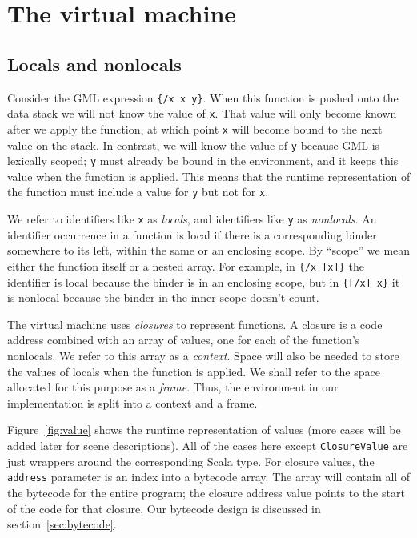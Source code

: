 \section{The virtual machine\label{sec:vm}}

\subsection{Locals and nonlocals\label{sec:localsvsnonlocals}}

Consider the GML expression \verb!{/x x y}!.
When this function is pushed onto the data stack
we will not know the value of \verb!x!.
That value will only become known after we apply the function,
at which point \verb!x! will become bound to the next value on the stack.
In contrast, we will know the value of \verb!y!
because GML is lexically scoped;
\verb!y! must already be bound in the environment,
and it keeps this value when the function is applied.
This means that the runtime representation of the function
must include a value for \verb!y! but not for \verb!x!.

We refer to identifiers like \verb!x! as \emph{locals},
and identifiers like \verb!y! as \emph{nonlocals}.
An identifier occurrence in a function is local if
there is a corresponding binder somewhere to its left,
within the same or an enclosing scope.
By ``scope'' we mean either the function itself or a nested array.
For example, in \verb!{/x [x]}! the identifier is local because
the binder is in an enclosing scope,
but in \verb!{[/x] x}! it is nonlocal
because the binder in the inner scope doesn't count.

The virtual machine uses \emph{closures} to represent functions.
A closure is a code address combined with an array of values,
one for each of the function's nonlocals.
We refer to this array as a \emph{context}.
Space will also be needed to store the values of locals
when the function is applied.
We shall refer to the space allocated for this purpose as a \emph{frame}.
Thus, the environment in our implementation
is split into a context and a frame.

Figure~\ref{fig:value} shows the runtime representation of values
(more cases will be added later for scene descriptions).
All of the cases here except \verb!ClosureValue!
are just wrappers around the corresponding Scala type.
For closure values, the \verb!address! parameter
is an index into a bytecode array.
The array will contain all of the bytecode for the entire program;
the closure address value points to the start of the code for that closure.
Our bytecode design is discussed in section~\ref{sec:bytecode}.


